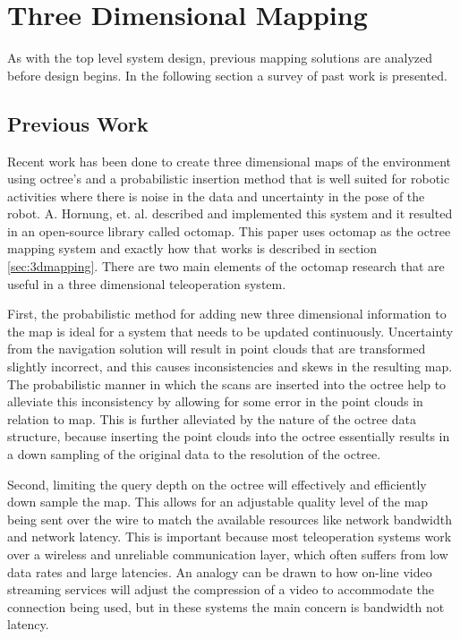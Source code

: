 \documentclass[12pt]{report}
\begin{document}

\chapter{Three Dimensional Mapping}\label{chap:3d_mapping}
As with the top level system design, previous mapping solutions are analyzed before design begins.  In the following section a survey of past work is presented.

\section{Previous Work}
\label{sec:previouswork_3dmapping}
Recent work has been done to create three dimensional maps of the environment using octree's and a probabilistic insertion method that is well suited for robotic activities where there is noise in the data and uncertainty in the pose of the robot. A. Hornung, et. al. described and implemented this system and it resulted in an open-source library called octomap.\cite{octomap} This paper uses octomap as the octree mapping system and exactly how that works is described in section \ref{sec:3dmapping}.  There are two main elements of the octomap research that are useful in a three dimensional teleoperation system.

First, the probabilistic method for adding new three dimensional information to the map is ideal for a system that needs to be updated continuously.  Uncertainty from the navigation solution will result in point clouds that are transformed slightly incorrect, and this causes inconsistencies and skews in the resulting map. The probabilistic manner in which the scans are inserted into the octree help to alleviate this inconsistency by allowing for some error in the point clouds in relation to map. This is further alleviated by the nature of the octree data structure, because inserting the point clouds into the octree essentially results in a down sampling of the original data to the resolution of the octree.

Second, limiting the query depth on the octree will effectively and efficiently down sample the map.  This allows for an adjustable quality level of the map being sent over the wire to match the available resources like network bandwidth and network latency.  This is important because most teleoperation systems work over a wireless and unreliable communication layer, which often suffers from low data rates and large latencies.  An analogy can be drawn to how on-line video streaming services will adjust the compression of a video to accommodate the connection being used, but in these systems the main concern is bandwidth not latency.
\end{document}
